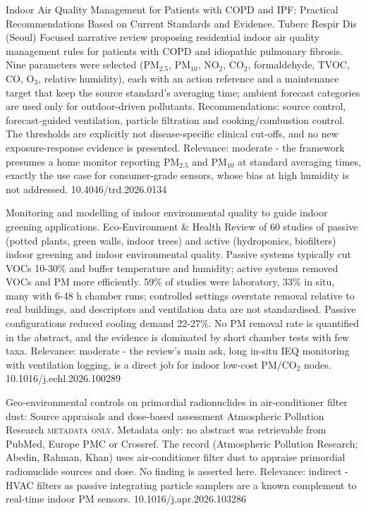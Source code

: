\documentclass[10pt]{article}
\begin{document}
{Indoor Air Quality Management for Patients with COPD and IPF: Practical Recommendations Based on Current Standards and Evidence.}
{Tuberc Respir Dis (Seoul)}
{Focused narrative review proposing residential indoor air quality management rules for patients with COPD and idiopathic pulmonary fibrosis. Nine parameters were selected (PM$_{2.5}$, PM$_{10}$, NO$_2$, CO$_2$, formaldehyde, TVOC, CO, O$_3$, relative humidity), each with an action reference and a maintenance target that keep the source standard's averaging time; ambient forecast categories are used only for outdoor-driven pollutants. Recommendations: source control, forecast-guided ventilation, particle filtration and cooking/combustion control. The thresholds are explicitly not disease-specific clinical cut-offs, and no new exposure-response evidence is presented. Relevance: moderate - the framework presumes a home monitor reporting PM$_{2.5}$ and PM$_{10}$ at standard averaging times, exactly the use case for consumer-grade sensors, whose bias at high humidity is not addressed.}
{10.4046/trd.2026.0134}

{Monitoring and modelling of indoor environmental quality to guide indoor greening applications.}
{Eco-Environment \& Health}
{Review of 60 studies of passive (potted plants, green walls, indoor trees) and active (hydroponics, biofilters) indoor greening and indoor environmental quality. Passive systems typically cut VOCs 10-30\% and buffer temperature and humidity; active systems removed VOCs and PM more efficiently. 59\% of studies were laboratory, 33\% in situ, many with 6-48 h chamber runs; controlled settings overstate removal relative to real buildings, and descriptors and ventilation data are not standardised. Passive configurations reduced cooling demand 22-27\%. No PM removal rate is quantified in the abstract, and the evidence is dominated by short chamber tests with few taxa. Relevance: moderate - the review's main ask, long in-situ IEQ monitoring with ventilation logging, is a direct job for indoor low-cost PM/CO$_2$ nodes.}
{10.1016/j.eehl.2026.100289}

{Geo-environmental controls on primordial radionuclides in air-conditioner filter dust: Source appraisals and dose-based assessment}
{Atmospheric Pollution Research}
{\textsc{metadata only.} Metadata only: no abstract was retrievable from PubMed, Europe PMC or Crossref. The record (Atmospheric Pollution Research; Abedin, Rahman, Khan) uses air-conditioner filter dust to appraise primordial radionuclide sources and dose. No finding is asserted here. Relevance: indirect - HVAC filters as passive integrating particle samplers are a known complement to real-time indoor PM sensors.}
{10.1016/j.apr.2026.103286}
\end{document}
